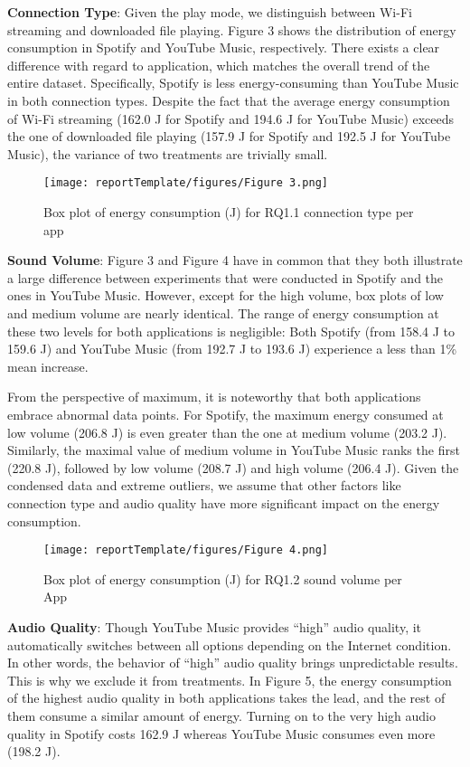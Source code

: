 \textbf{Connection Type}: Given the play mode, we distinguish between Wi-Fi streaming and downloaded file playing. Figure 3 shows the distribution of energy consumption in Spotify and YouTube Music, respectively. There exists a clear difference with regard to application, which matches the overall trend of the entire dataset. Specifically, Spotify is less energy-consuming than YouTube Music in both connection types. Despite the fact that the average energy consumption of Wi-Fi streaming (162.0 J for Spotify and 194.6 J for YouTube Music) exceeds the one of downloaded file playing (157.9 J for Spotify and 192.5 J for YouTube Music), the variance of two treatments are trivially small.

\begin{figure}[htbp]
 \centering
 \texttt{[image: reportTemplate/figures/Figure 3.png]}\caption{Box plot of energy consumption (J) for RQ1.1 connection type per app}
\end{figure}

\textbf{Sound Volume}: Figure 3 and Figure 4 have in common that they both illustrate a large difference between experiments that were conducted in Spotify and the ones in YouTube Music. However, except for the high volume, box plots of low and medium volume are nearly identical. The range of energy consumption at these two levels for both applications is negligible: Both Spotify (from 158.4 J to 159.6 J) and YouTube Music (from 192.7 J to 193.6 J) experience a less than 1\% mean increase. 

From the perspective of maximum, it is noteworthy that both applications embrace abnormal data points. For Spotify, the maximum energy consumed at low volume (206.8 J) is even greater than the one at medium volume (203.2 J). Similarly, the maximal value of medium volume in YouTube Music ranks the first (220.8 J), followed by low volume (208.7 J) and high volume (206.4 J). Given the condensed data and extreme outliers, we assume that other factors like connection type and audio quality have more significant impact on the energy consumption. 

\begin{figure}[htbp]
 \centering
 \texttt{[image: reportTemplate/figures/Figure 4.png]}\caption{Box plot of energy consumption (J) for RQ1.2 sound volume per App}
\end{figure}

\textbf{Audio Quality}: Though YouTube Music provides “high” audio quality, it automatically switches between all options depending on the Internet condition. In other words, the behavior of “high” audio quality brings unpredictable results. This is why we exclude it from treatments. In Figure 5, the energy consumption of the highest audio quality in both applications takes the lead, and the rest of them consume a similar amount of energy. Turning on to the very high audio quality in Spotify costs 162.9 J whereas YouTube Music consumes even more (198.2 J). 

